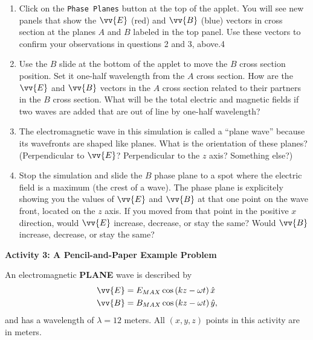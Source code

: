 \begin{enumerate}

\item Click on the \texttt{Phase Planes} button at the top of the applet.
You will see new panels that show the $\vv {E}$ (red) and $\vv {B}$ (blue) vectors in cross section at the
planes $A$ and $B$ labeled in the top panel.
Use these vectors to confirm your observations in questions 2 and 3, above.4
\vspace{3.0cm}

\item Use the $B$ slide at the bottom of the applet to move the $B$ cross 
section position.
Set it one-half wavelength from the $A$ cross section.
How are the $\vv {E}$ and $\vv {B}$ vectors in the $A$ cross section related to their partners 
in the $B$ cross section.
What will be the total electric and magnetic fields if two waves are added that are out of line
by one-half wavelength?
\vspace{1.5cm}

\item The electromagnetic wave in this simulation is called a ``plane wave'' because its wavefronts are shaped like planes.  What is the orientation of these planes?  (Perpendicular to $\vv {E}$?  Perpendicular to the $z$ axis? Something else?) 
\vspace{1.5cm}

\item Stop the simulation and slide the $B$ phase plane to a spot where the electric field is a maximum (the crest of a wave).  The phase plane is explicitely showing you the values of $\vv {E}$ and $\vv {B}$ at that one point on the wave front, located on the $z$ axis.  If you moved from that point in the positive $x$ direction, would $\vv {E}$ increase, decrease, or stay the same?  Would $\vv {B}$ increase, decrease, or stay the same? 
\vspace{2.0cm}

\end{enumerate}

\textbf{Activity 3: A Pencil-and-Paper Example Problem}

An electromagnetic \textbf{PLANE} wave is described by
\begin{align*}
\vv {E} &= E_{MAX} \cos \left ( kz - \omega t \right ) \hat x\\
\vv {B} &= B_{MAX} \cos \left ( kz - \omega t \right ) \hat y,
\end{align*}
and has a wavelength of $\lambda =12$ meters.  All $(x,y,z)$ points in this activity are in meters.

